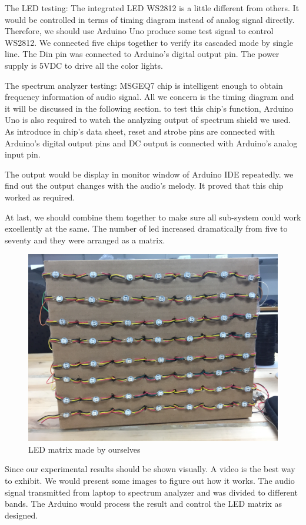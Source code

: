\documentclass[12pt,a4paper,journal]{IEEEtran}
\begin{document}
The LED testing: The integrated LED WS2812 is a little different from others. It would be controlled in terms of timing diagram instead of analog signal directly. Therefore, we should use Arduino Uno produce some test signal to control WS2812. We connected five chips together to verify its cascaded mode by single line. The Din pin was connected to Arduino's digital output pin. The power supply is 5VDC to drive all the color lights.

The spectrum analyzer testing: MSGEQ7 chip is intelligent enough to obtain frequency information of audio signal. All we concern is the timing diagram and it will be discussed in the following section. to test this chip's function, Arduino Uno is also required to watch the analyzing output of spectrum shield we used. As introduce in chip's data sheet, reset and strobe pins are connected with Arduino's digital output pins and DC output is connected with Arduino's analog input pin.

The output would be display in monitor window of Arduino IDE repeatedly. we find out the output changes with the audio's melody. It proved that this chip worked as required.

At last, we should combine them together to make sure all sub-system could work excellently at the same. The number of led increased dramatically from five to seventy and they were arranged as a matrix.
\begin{figure}[ht]
  \centering
  \includegraphics[width=0.9\linewidth]{ledmatrix.jpg}
  \caption{LED matrix made by ourselves}
  \label{fig:tas6}
\end{figure}
Since our experimental results should be shown visually. A video is the best way to exhibit. We would present some images to figure out how it works. The audio signal transmitted from laptop to spectrum analyzer and was divided to different bands. The Arduino would process the result and control the LED matrix as designed. 
\end{document}
